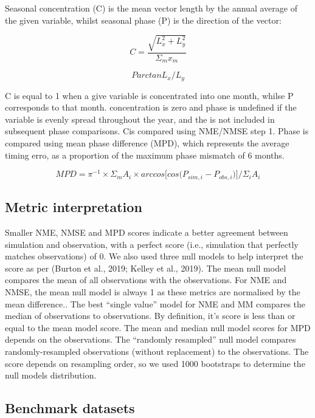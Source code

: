 \documentclass[bg, manuscript]{copernicus}
\begin{document}
Seasonal concentration (C) is the mean vector length by the annual average of the given variable, whilst seasonal phase (P) is the direction of the vector:

\begin{equation}
    C = \frac{\sqrt{L_x^2 + L_y^2}}{\Sigma_m x_m}
\end{equation}

\begin{equation}
    P arctan{L_x/L_y}
\end{equation}

C is equal to 1 when a give variable is concentrated into one month, whilse P corresponds to that month. concentration is zero and phase is undefined if the variable  is evenly spread throughout the year, and the is not included in subsequent phase comparisons. Cis compared using NME/NMSE step 1. Phase is compared using mean phase difference (MPD), which represents the average timing erro, as a proportion of the maximum phase mismatch of 6 months.

\begin{equation}
    MPD = \pi^{-1} \times \Sigma_m A_i \times arccos \big[ cos \big(P_{sim, i} - P_{obs, i} \big) \big] / \Sigma_i A_i 
\end{equation}

\subsection{Metric interpretation}
Smaller NME, NMSE and MPD scores indicate a better agreement between simulation and observation, with a perfect score (i.e., simulation that perfectly matches observations) of 0. We also used three null models to help interpret the score as per (Burton et al., 2019; Kelley et al., 2019). The mean null model compares the mean of all observations with the observations. For NME and NMSE, the mean null model is always 1 as these metrics are normalised by the mean difference.. The best “single value” model for NME and MM compares the median of observations to observations. By definition, it’s score is less than or equal to the mean model score. The mean and median null model scores for MPD depends on the observations. The “randomly resampled” null model compares randomly-resampled observations (without replacement) to the observations. The score depends on resampling order, so we used 1000 bootstraps to determine the null models distribution. 


\subsection{Benchmark datasets}
\end{document}
